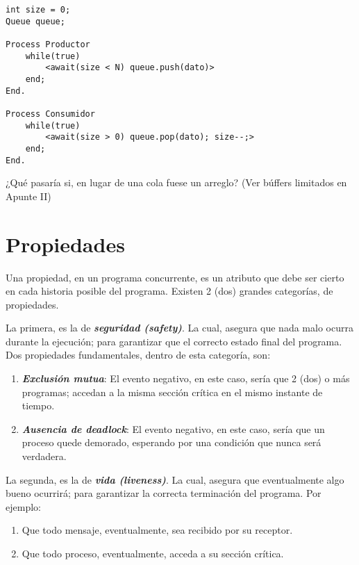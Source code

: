 \documentclass[a4paper, 10pt]{report}
\begin{document}
\begin{lstlisting}
int size = 0;
Queue queue;
    
Process Productor
    while(true)
        <await(size < N) queue.push(dato)>
    end;
End.

Process Consumidor
    while(true)
        <await(size > 0) queue.pop(dato); size--;>
    end;
End.
\end{lstlisting}

\begin{basic_box}
     ¿Qué pasaría si, en lugar de una cola fuese un arreglo? (Ver búffers limitados en Apunte II)
\end{basic_box}

\section{Propiedades}

Una propiedad, en un programa concurrente, es un atributo que debe ser cierto en cada historia posible del programa. Existen 2 (dos) grandes categorías, de propiedades.

La primera, es la de \textbf{\emph{seguridad (safety)}}. La cual, asegura que nada malo ocurra durante la ejecución; para garantizar que el correcto estado final del programa. Dos propiedades fundamentales, dentro de esta categoría, son:

\begin{enumerate}
    \item \textbf{\emph{Exclusión mutua}}: El evento negativo, en este caso, sería que 2 (dos) o más programas; accedan a la misma sección crítica en el mismo instante de tiempo.
    \item \textbf{\emph{Ausencia de deadlock}}: El evento negativo, en este caso, sería que un proceso quede demorado, esperando por una condición que nunca será verdadera. 
\end{enumerate}

La segunda, es la de \textbf{\emph{vida (liveness)}}. La cual, asegura que eventualmente algo bueno ocurrirá; para garantizar la correcta terminación del programa. Por ejemplo:

\begin{enumerate}
    \item Que todo mensaje, eventualmente, sea recibido por su receptor.
    \item Que todo proceso, eventualmente, acceda a su sección crítica.
\end{enumerate}
\end{document}
